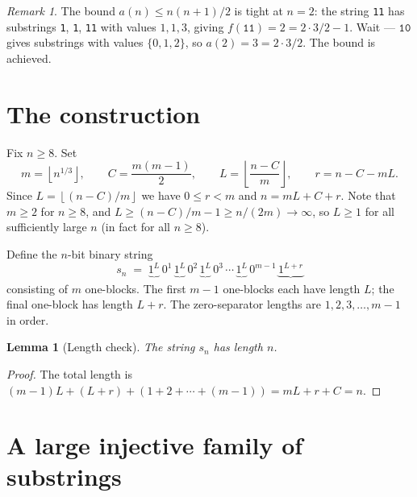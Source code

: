 \documentclass[12pt,a4paper]{article}
\theoremstyle{plain}
\newtheorem{lemma}[theorem]{Lemma}
\theoremstyle{definition}
\theoremstyle{remark}
\newtheorem{remark}[theorem]{Remark}
\newcommand{\floor}[1]{\left\lfloor #1 \right\rfloor}
\begin{document}
\begin{remark}
  The bound $a(n) \le n(n+1)/2$ is tight at $n = 2$: the string
  \texttt{11} has substrings \texttt{1}, \texttt{1}, \texttt{11} with
  values $1, 1, 3$, giving $f(\texttt{11}) = 2 = 2 \cdot 3/2 - 1$.
  Wait --- $\texttt{10}$ gives substrings with values $\{0, 1, 2\}$, so
  $a(2) = 3 = 2 \cdot 3/2$.  The bound is achieved.
\end{remark}

\section{The construction}\label{sec:construction}

Fix $n \ge 8$.  Set
\[
  m = \floor{n^{1/3}}, \qquad
  C = \frac{m(m-1)}{2}, \qquad
  L = \floor{\frac{n - C}{m}}, \qquad
  r = n - C - mL.
\]
Since $L = \floor{(n-C)/m}$ we have $0 \le r < m$ and
$n = mL + C + r$.  Note that $m \ge 2$ for $n \ge 8$, and
$L \ge (n-C)/m - 1 \ge n/(2m) \to \infty$, so $L \ge 1$ for all
sufficiently large $n$ (in fact for all $n \ge 8$).

Define the $n$-bit binary string
\begin{equation}\label{eq:sn}
  s_n \;=\;
  \underbrace{1^L}_{}\,
  0^1\,
  \underbrace{1^L}_{}\,
  0^2\,
  \underbrace{1^L}_{}\,
  0^3\,
  \cdots\,
  \underbrace{1^L}_{}\,
  0^{m-1}\,
  \underbrace{1^{L+r}}_{}
\end{equation}
consisting of $m$ one-blocks.  The first $m-1$ one-blocks each have
length $L$; the final one-block has length $L + r$.  The zero-separator
lengths are $1, 2, 3, \ldots, m-1$ in order.

\begin{lemma}[Length check]
  The string $s_n$ has length $n$.
\end{lemma}

\begin{proof}
  The total length is $(m-1)L + (L+r) + (1 + 2 + \cdots + (m-1))
  = mL + r + C = n$.
\end{proof}

\section{A large injective family of substrings}\label{sec:family}
\end{document}
